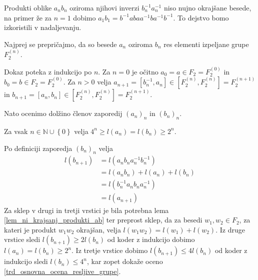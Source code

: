 \begin{opomba}
Produkti oblike $a_n b_n$ oziroma njihovi inverzi $b_n ^{-1} a_n ^{-1}$ niso nujno okrajšane besede, na primer že za $n = 1$ dobimo $a_1 b_1 = b^{-1} a b a a^{-1} b a^{-1} b^{-1}$. To dejstvo bomo izkoristili v nadaljevanju. 
\end{opomba}

Najprej se prepričajmo, da so besede $a_n$ oziroma $b_n$ res elementi izpeljane grupe $F_2^{(n)}$.

\begin{lema}
\label{lem_besede_ab_so_elementi_izpeljane_grupe}
\end{lema}
\begin{dokaz}
    Dokaz poteka z indukcijo po $n$. Za $n = 0$ je očitno $a_0 = a \in F_2 = F_2^{(0)}$ in $b_0 = b \in F_2 = F_2^{(0)}$. Za $n > 0$ velja $a_{n + 1} = [b_n^{-1}, a_n] \in \left[ F_2^{(n)}, F_2^{(n)} \right] = F_2^{(n + 1)}$ in $b_{n+1} = [a_{n}, b_{n}] \in  \left[ F_2^{(n)}, F_2^{(n)} \right] = F_2^{(n + 1)}$. 
\end{dokaz}

Nato ocenimo dolžino členov zaporedij $(a_{n})_n$ in $(b_{n})_n$.

\begin{lema}
\label{lem_ocena_dolzine_clenov_zaporedij_ab}
Za vsak $n \in \mathbb{N} \cup \left\{ 0\right\}$ velja $4^{n} \ge l(a_{n}) = l(b_{n}) \ge 2^{n}$.
\end{lema}
\begin{dokaz}
Po definiciji zaporedja $(b_n)_n$ velja \begin{align*}
    l(b_{n+1}) &= l(a_{n} b_{n} a_{n}^{-1} b_{n}^{-1}) \\
     &= l(a_{n} b_{n}) + l(a_{n}) + l(b_{n}) \\
     &= l(b_{n}^{-1} a_{n} b_{n} a_{n}^{-1}) \\
     &= l(a_{n + 1})
\end{align*}
Za sklep v drugi in tretji vrstici je bila potrebna lema \ref{lem_ni_krajsanj_produkti_ab} ter preprost sklep, da za besedi $w_1, w_2 \in F_2$, za kateri je produkt $w_1 w_2$ okrajšan, velja $l(w_1 w_2) = l(w_1) + l(w_2)$.
Iz druge vrstice sledi $l(b_{n+1}) \ge  2 l(b_n)$ od koder z indukcijo dobimo $l(a_{n}) = l(b_{n}) \ge 2^{n}$. Iz tretje vrstice dobimo $l(b_{n+1}) \le 4 l(b_n)$ od koder z indukcijo sledi $l(b_n) \le 4^{n}$, kar zopet dokaže oceno \ref{trd_osnovna_ocena_resljive_grupe}.    
\end{dokaz}

